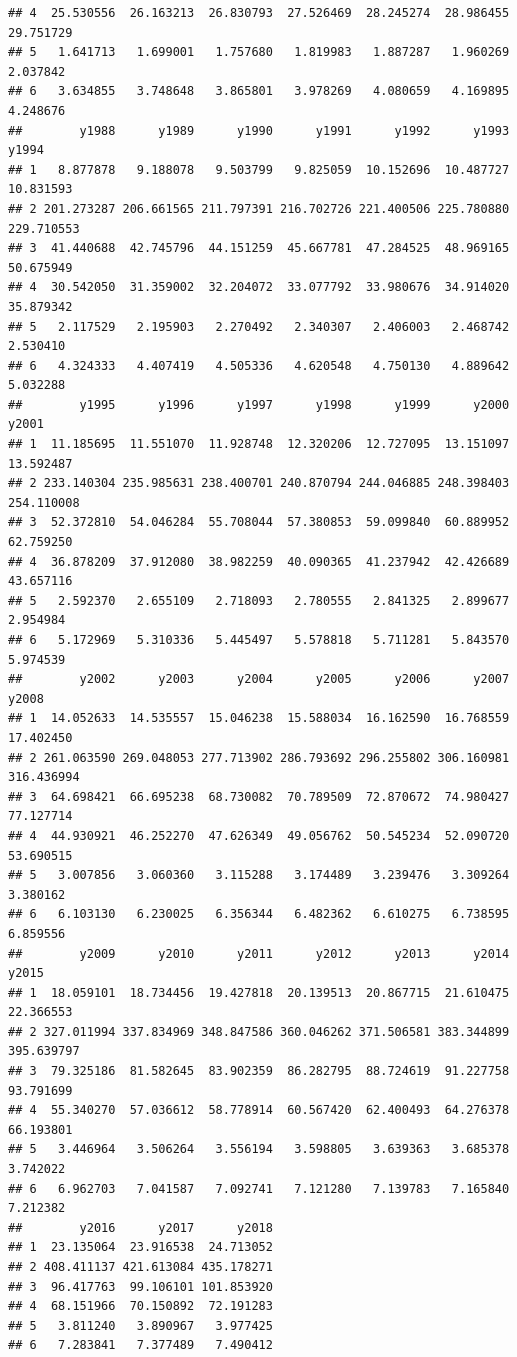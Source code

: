\documentclass[
]{book}
\begin{document}
\begin{verbatim}
## 4  25.530556  26.163213  26.830793  27.526469  28.245274  28.986455  29.751729
## 5   1.641713   1.699001   1.757680   1.819983   1.887287   1.960269   2.037842
## 6   3.634855   3.748648   3.865801   3.978269   4.080659   4.169895   4.248676
##        y1988      y1989      y1990      y1991      y1992      y1993      y1994
## 1   8.877878   9.188078   9.503799   9.825059  10.152696  10.487727  10.831593
## 2 201.273287 206.661565 211.797391 216.702726 221.400506 225.780880 229.710553
## 3  41.440688  42.745796  44.151259  45.667781  47.284525  48.969165  50.675949
## 4  30.542050  31.359002  32.204072  33.077792  33.980676  34.914020  35.879342
## 5   2.117529   2.195903   2.270492   2.340307   2.406003   2.468742   2.530410
## 6   4.324333   4.407419   4.505336   4.620548   4.750130   4.889642   5.032288
##        y1995      y1996      y1997      y1998      y1999      y2000      y2001
## 1  11.185695  11.551070  11.928748  12.320206  12.727095  13.151097  13.592487
## 2 233.140304 235.985631 238.400701 240.870794 244.046885 248.398403 254.110008
## 3  52.372810  54.046284  55.708044  57.380853  59.099840  60.889952  62.759250
## 4  36.878209  37.912080  38.982259  40.090365  41.237942  42.426689  43.657116
## 5   2.592370   2.655109   2.718093   2.780555   2.841325   2.899677   2.954984
## 6   5.172969   5.310336   5.445497   5.578818   5.711281   5.843570   5.974539
##        y2002      y2003      y2004      y2005      y2006      y2007      y2008
## 1  14.052633  14.535557  15.046238  15.588034  16.162590  16.768559  17.402450
## 2 261.063590 269.048053 277.713902 286.793692 296.255802 306.160981 316.436994
## 3  64.698421  66.695238  68.730082  70.789509  72.870672  74.980427  77.127714
## 4  44.930921  46.252270  47.626349  49.056762  50.545234  52.090720  53.690515
## 5   3.007856   3.060360   3.115288   3.174489   3.239476   3.309264   3.380162
## 6   6.103130   6.230025   6.356344   6.482362   6.610275   6.738595   6.859556
##        y2009      y2010      y2011      y2012      y2013      y2014      y2015
## 1  18.059101  18.734456  19.427818  20.139513  20.867715  21.610475  22.366553
## 2 327.011994 337.834969 348.847586 360.046262 371.506581 383.344899 395.639797
## 3  79.325186  81.582645  83.902359  86.282795  88.724619  91.227758  93.791699
## 4  55.340270  57.036612  58.778914  60.567420  62.400493  64.276378  66.193801
## 5   3.446964   3.506264   3.556194   3.598805   3.639363   3.685378   3.742022
## 6   6.962703   7.041587   7.092741   7.121280   7.139783   7.165840   7.212382
##        y2016      y2017      y2018
## 1  23.135064  23.916538  24.713052
## 2 408.411137 421.613084 435.178271
## 3  96.417763  99.106101 101.853920
## 4  68.151966  70.150892  72.191283
## 5   3.811240   3.890967   3.977425
## 6   7.283841   7.377489   7.490412
\end{verbatim}
\end{document}
